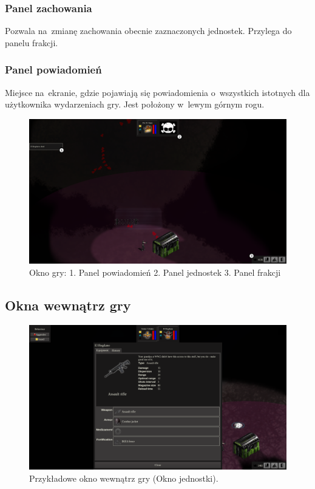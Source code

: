 \documentclass[licencjacka]{pracamgr}
\begin{document}
      \subsubsection{Panel zachowania}
	Pozwala na~zmianę zachowania obecnie zaznaczonych jednostek. Przylega do panelu frakcji.
      \subsubsection{Panel powiadomień}
	Miejsce na~ekranie, gdzie pojawiają się powiadomienia o~wszystkich istotnych dla użytkownika wydarzeniach gry. Jest położony w~lewym górnym rogu.

      \begin{figure}[htbp]
	    \centering
	    \includegraphics[scale=0.22]{Game.png}
	    \caption{Okno gry: 1. Panel powiadomień 2. Panel jednostek 3. Panel frakcji}
      \end{figure}

    \subsection{Okna wewnątrz gry}

      \begin{figure}[htbp]
	\centering
	\includegraphics[scale=0.22]{Window.png}
	\caption{Przykładowe okno wewnątrz gry (Okno jednostki).}
      \end{figure}
\end{document}
